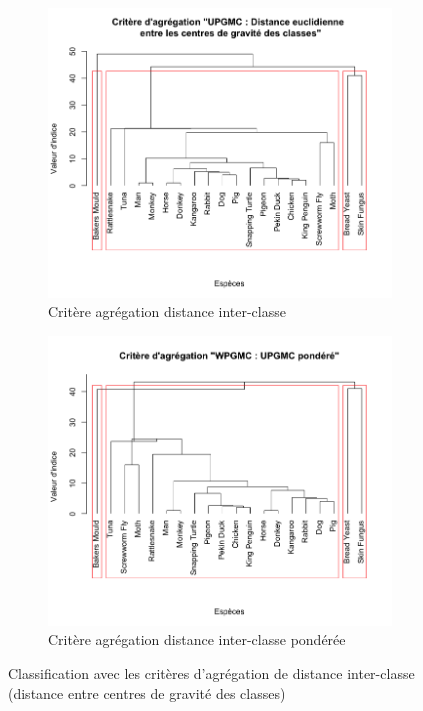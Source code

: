 \documentclass[a4paper,10pt]{report}
\begin{document}
\begin{figure}[H]
	\centering
	\captionsetup{justification=centering, margin=3cm}
	\begin{subfigure}[b]{0.4\linewidth}
		\centering
		\captionsetup{justification=centering}
		\includegraphics[width=1\linewidth]{img/2-1-mut-hierarchie-centroid}
		\caption{\scriptsize Critère agrégation distance inter-classe}
		\label{fig:2-1-mut-hierarchie-centroid}
	\end{subfigure}%
	\begin{subfigure}[b]{0.4\linewidth}
		\centering
		\captionsetup{justification=centering}
		\includegraphics[width=1\linewidth]{img/2-1-mut-hierarchie-centroid-ponderee}
		\caption{\scriptsize Critère agrégation distance inter-classe pondérée}
		\label{fig:2-1-mut-hierarchie-centroid-ponderee}
	\end{subfigure}%
	\caption{\small Classification avec les critères d'agrégation de distance inter-classe (distance entre centres de gravité des classes)}
	\label{fig:2-1-classification-mut-centroid}%
\end{figure}
\end{document}

